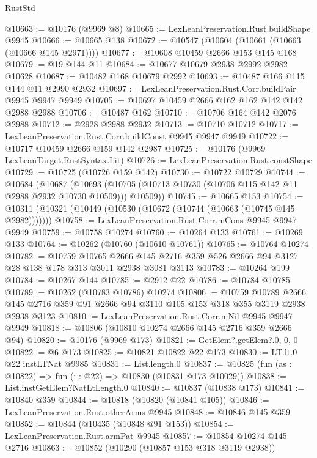 \begin{lexlean}{RustStd}
\begin{coremodule}
{\begin{coremodule}
{{{{{{{{{{{{{{{{{{{{{{{{{{{{{{{{{{{{{{{{{{{{{{{{{{{{{{{{{{{{{{{{{{{{{{{{{{{{{{@10663 := @10176 (@9969 @8)
@10665 := LexLeanPreservation.Rust.buildShape @9945
@10666 := @10665 @138
@10672 := @10547 (@10604 (@10661 (@10663 (@10666 @145 @2971))))
@10677 := @10608 @10459 @2666 @153 @145 @168
@10679 := @19 @144 @11
@10684 := @10677 @10679 @2938 @2992 @2982 @10628
@10687 := @10482 @168 @10679 @2992
@10693 := @10487 @166 @115 @144 @11 @2990 @2932
@10697 := LexLeanPreservation.Rust.Corr.buildPair @9945 @9947 @9949
@10705 := @10697 @10459 @2666 @162 @162 @142 @142 @2988 @2988
@10706 := @10487 @162
@10710 := @10706 @164 @142 @2076 @2988
@10712 := @2928 @2988 @2932
@10713 := @10710 @10712
@10717 := LexLeanPreservation.Rust.Corr.buildConst @9945 @9947 @9949
@10722 := @10717 @10459 @2666 @159 @142 @2987
@10725 := @10176 (@9969 LexLeanTarget.RustSyntax.Lit)
@10726 := LexLeanPreservation.Rust.constShape
@10729 := @10725 (@10726 @159 @142)
@10730 := @10722 @10729
@10744 := @10684
    (@10687
      (@10693 (@10705 (@10713 @10730 (@10706 @115 @142 @11 @2988 @2932 @10730 @10509))) @10509))
@10745 := @10665 @153
@10754 := @10311 (@10321 (@10449 (@10530 (@10672 (@10744 (@10663 (@10745 @145 @2982)))))))
@10758 := LexLeanPreservation.Rust.Corr.mCons @9945 @9947 @9949
@10759 := @10758 @10274
@10760 := @10264 @133
@10761 := @10269 @133
@10764 := @10262 (@10760 (@10610 @10761))
@10765 := @10764 @10274
@10782 := @10759
    @10765
    @2666
    @145
    @2716
    @359
    @526
    @2666
    @94
    @3127
    @28
    @138
    @178
    @313
    @3011
    @2938
    @3081
    @3113
@10783 := @10264 @199
@10784 := @10267 @144
@10785 := @2912 @22
@10786 := @10784 @10785
@10789 := @10262 (@10783 @10786) @10274
@10806 := @10759
    @10789
    @2666
    @145
    @2716
    @359
    @91
    @2666
    @94
    @3110
    @105
    @153
    @318
    @355
    @3119
    @2938
    @2938
    @3123
@10810 := LexLeanPreservation.Rust.Corr.mNil @9945 @9947 @9949
@10818 := @10806 (@10810 @10274 @2666 @145 @2716 @359 @2666 @94)
@10820 := @10176 (@9969 @173)
@10821 := GetElem?.getElem?.{0, 0, 0}
@10822 := @6 @173
@10825 := @10821 @10822 @22 @173
@10830 := LT.lt.{0} @22 instLTNat @9985
@10831 := List.length.{0}
@10837 := @10825 (fun (as : @10822) => fun (i : @22) => @10830 (@10831 @173 @10029))
@10838 := List.instGetElem?NatLtLength.{0}
@10840 := @10837 (@10838 @173)
@10841 := @10840 @359
@10844 := @10818 (@10820 (@10841 @105))
@10846 := LexLeanPreservation.Rust.otherArms @9945
@10848 := @10846 @145 @359
@10852 := @10844 (@10435 (@10848 @91 @153))
@10854 := LexLeanPreservation.Rust.armPat @9945
@10857 := @10854 @10274 @145 @2716
@10863 := @10852 (@10290 (@10857 @153 @318 @3119 @2938))
}}}}}}}}}}}}}}}}}}}}}}}}}}}}}}}}}}}}}}}}}}}}}}}}}}}}}}}}}}}}}}}}}}}}}}}}}}}}}}
\end{coremodule}}
\end{coremodule}
\end{lexlean}
